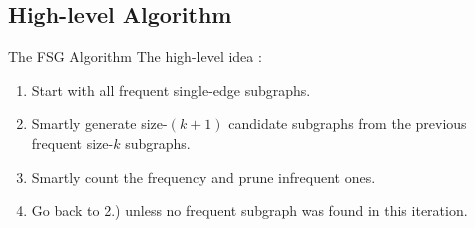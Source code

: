 \documentclass[10pt, aspectratio=149]{beamer}
\begin{document}
\subsection{High-level Algorithm}

\begin{frame}{The FSG Algorithm}
The high-level idea \cite{FSG}:

\begin{enumerate}
    \item Start with all frequent single-edge subgraphs.
    \item Smartly generate size-$(k+1)$ candidate subgraphs from the previous frequent size-$k$ subgraphs.
    \item Smartly count the frequency and prune infrequent ones.
    \item Go back to 2.) unless no frequent subgraph was found in this iteration.
\end{enumerate}
\end{frame}
\end{document}
